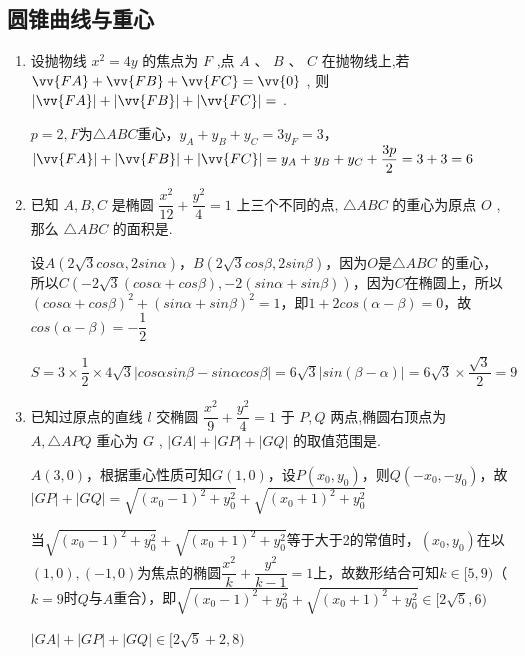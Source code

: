 \subsection*{圆锥曲线与重心}
\begin{enumerate}
    \item 设抛物线 ${x}^{2} = {4y}$ 的焦点为 ${F}$ ,点 $A\text{ 、 }B\text{ 、 }C$ 在抛物线上,若 $\vv{FA} + \vv{FB} + \vv{FC} = \vv{0}$ , 则 $\left| \vv{FA}\right|  + \left| \vv{FB}\right|  + \left| \vv{FC}\right|  =$ .
    \begin{jieda}
        $p = 2, F$为$\triangle ABC$重心，$y_A+y_B+y_C = 3y_F = 3$，$\left| \vv{FA}\right|  + \left| \vv{FB}\right|  + \left| \vv{FC}\right|  = y_A+y_B+y_C + \dfrac{3p}{2} = 3+3 = 6$
    \end{jieda}
    \item 已知 $A,B,C$ 是椭圆 $\dfrac{{x}^{2}}{12} + \dfrac{{y}^{2}}{4} = 1$ 上三个不同的点, $\bigtriangleup  {ABC}$ 的重心为原点 $O$ ,那么 $\bigtriangleup  {ABC}$ 的面积是.
    \begin{jieda}
        设$A(2\sqrt{3}cos\alpha, 2sin\alpha)$，$B(2\sqrt{3}cos\beta, 2sin\beta)$，因为$O$是$\bigtriangleup  {ABC}$ 的重心，所以$C(-2\sqrt{3}(cos\alpha + cos\beta), -2(sin\alpha+sin\beta))$，因为$C$在椭圆上，所以$(cos\alpha + cos\beta)^2+(sin\alpha+sin\beta)^2 = 1$，即$1+2cos(\alpha-\beta) = 0$，故$cos(\alpha - \beta) = -\dfrac{1}{2}$

        $S = 3 \times \dfrac{1}{2} \times 4\sqrt{3}|cos\alpha sin\beta - sin\alpha cos\beta| = 6\sqrt{3}|sin(\beta-\alpha)| = 6\sqrt{3} \times \dfrac{\sqrt{3}}{2} = 9$

    \end{jieda}
    \item 已知过原点的直线 $l$ 交椭圆 $\dfrac{{x}^{2}}{9} + \dfrac{{y}^{2}}{4} = 1$ 于 $P,Q$ 两点,椭圆右顶点为 $A,\bigtriangleup {APQ}$ 重心为 $G$ , $\left| {GA}\right|  + \left| {GP}\right|  + \left| {GQ}\right|$ 的取值范围是\blkda[3]{$[2\sqrt{5}+2, 8)$}.
    \begin{jieda}
        $A(3, 0)$，根据重心性质可知$G(1, 0)$，设$P(x_0, y_0)$，则$Q(-x_0, -y_0)$，故$|GP|+|GQ| = \sqrt{(x_0-1)^2+y_0^2}+\sqrt{(x_0+1)^2+y_0^2}$

        当$\sqrt{(x_0-1)^2+y_0^2}+\sqrt{(x_0+1)^2+y_0^2}$等于大于2的常值时，$(x_0, y_0)$在以$(1, 0), (-1, 0)$为焦点的椭圆$\dfrac{x^2}{k}+\dfrac{y^2}{k-1} = 1$上，故数形结合可知$k \in [5, 9)$（$k = 9$时$Q$与$A$重合），即$\sqrt{(x_0-1)^2+y_0^2}+\sqrt{(x_0+1)^2+y_0^2} \in [2\sqrt{5}, 6)$

        $\left| {GA}\right|  + \left| {GP}\right|  + \left| {GQ}\right| \in [2\sqrt{5}+2, 8)$
    \end{jieda}
\end{enumerate}

